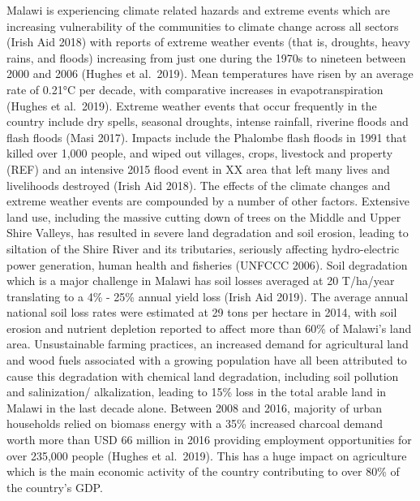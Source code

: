 \documentclass[
]{book}
\begin{document}
Malawi is experiencing climate related hazards and extreme events which are increasing vulnerability of the communities to climate change across all sectors
(Irish Aid 2018) with reports of extreme weather events (that is, droughts, heavy rains, and floods) increasing from just one during the 1970s to nineteen
between 2000 and 2006 (Hughes et al.~2019). Mean temperatures have risen by an average rate of 0.21°C per decade, with comparative increases in
evapotranspiration (Hughes et al.~2019). Extreme weather events that occur frequently in the country include dry spells, seasonal droughts, intense rainfall,
riverine floods and flash floods (Masi 2017). Impacts include the Phalombe flash floods in 1991 that killed over 1,000 people, and wiped out villages, crops,
livestock and property (REF) and an intensive 2015 flood event in XX area that left many lives and livelihoods destroyed (Irish Aid 2018). The effects of the
climate changes and extreme weather events are compounded by a number of other factors. Extensive land use, including the massive cutting down of trees on the
Middle and Upper Shire Valleys, has resulted in severe land degradation and soil erosion, leading to siltation of the Shire River and its tributaries, seriously
affecting hydro-electric power generation, human health and fisheries (UNFCCC 2006). Soil degradation which is a major challenge in Malawi has soil losses
averaged at 20 T/ha/year translating to a 4\% - 25\% annual yield loss (Irish Aid 2019). The average annual national soil loss rates were estimated at 29 tons per
hectare in 2014, with soil erosion and nutrient depletion reported to affect more than 60\% of Malawi's land area. Unsustainable farming practices, an increased
demand for agricultural land and wood fuels associated with a growing population have all been attributed to cause this degradation with chemical land
degradation, including soil pollution and salinization/ alkalization, leading to 15\% loss in the total arable land in Malawi in the last decade alone. Between
2008 and 2016, majority of urban households relied on biomass energy with a 35\% increased charcoal demand worth more than USD 66 million in 2016 providing
employment opportunities for over 235,000 people (Hughes et al.~2019). This has a huge impact on agriculture which is the main economic activity of the country
contributing to over 80\% of the country's GDP.
\end{document}
